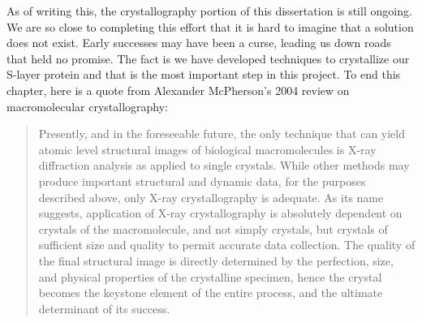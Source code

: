 As of writing this, the crystallography portion of this dissertation is still ongoing. We are so close to completing this effort that it is hard to imagine that a solution does not exist. Early successes may have been a curse, leading us down roads that held no promise. The fact is we have developed techniques to crystallize our \ac{S-layer} protein and that is the most important step in this project. To end this chapter, here is a quote from Alexander McPherson's 2004 review on macromolecular crystallography:

\begin{quote}
 Presently, and in the foreseeable future, the only technique that can yield atomic level structural images of biological macromolecules is X-ray diffraction analysis as applied to single crystals. While other methods may produce important structural and dynamic data, for the purposes described above, only X-ray crystallography is adequate. As its name suggests, application of X-ray crystallography is absolutely dependent on crystals of the macromolecule, and not simply crystals, but crystals of sufficient size and quality to permit accurate data collection. The quality of the final structural image is directly determined by the perfection, size, and physical properties of the crystalline specimen, hence the crystal becomes the keystone element of the entire process, and the ultimate determinant of its success.
\end{quote}